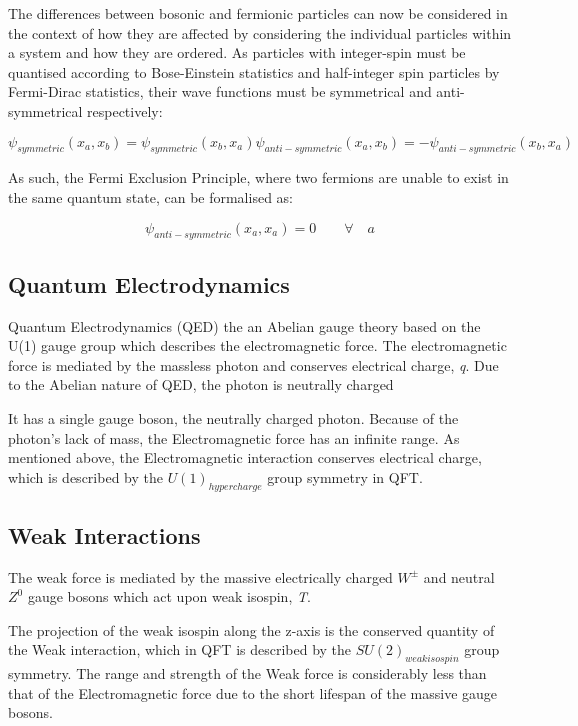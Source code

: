 The differences between bosonic and fermionic particles can now be considered in the context of how they are affected by considering the individual particles within a system and how they are ordered. 
As particles with integer-spin must be quantised according to Bose-Einstein statistics and half-integer spin particles by Fermi-Dirac statistics, their wave functions must be symmetrical and anti-symmetrical respectively\cite{QM}:

\begin{equation}
\psi_{symmetric}(x_{a},x_{b}) = \psi_{symmetric}(x_{b},x_{a})
\psi_{anti-symmetric}(x_{a},x_{b}) = -\psi_{anti-symmetric}(x_{b},x_{a})
\end{equation}

As such, the Fermi Exclusion Principle, where two fermions are unable to exist in the same quantum state, can be formalised as\cite{QM}:

\begin{equation}
\psi_{anti-symmetric}(x_{a},x_{a}) = 0 \qquad \forall \quad a
\end{equation}

\subsection{Quantum Electrodynamics}\label{subsec:QED}
Quantum Electrodynamics (QED) the an Abelian gauge theory based on the U(1) gauge group which describes the electromagnetic force.
The electromagnetic force is mediated by the massless photon and conserves electrical charge, \emph{q}.
Due to the Abelian nature of QED, the photon is neutrally charged


It has a single gauge boson, the neutrally charged photon. 
Because of the photon's lack of mass, the Electromagnetic force has an infinite range. 
As mentioned above, the Electromagnetic interaction conserves electrical charge, which is described by the $U(1)_{hypercharge}$ group symmetry in QFT\cite{QFT}. 

\subsection{Weak Interactions}\label{subsec:weakForce}
The weak force is mediated by the massive electrically charged $W^{\pm}$ and neutral $Z^{0}$ gauge bosons which act upon weak isospin, \emph{T}.

The projection of the weak isospin along the z-axis is the conserved quantity of the Weak interaction, which in QFT is described by the $SU(2)_{weak isospin}$ group symmetry. 
The range and strength of the Weak force is considerably less than that of the Electromagnetic force due to the short lifespan of the massive gauge bosons\cite{ElectroweakStrong}. 


